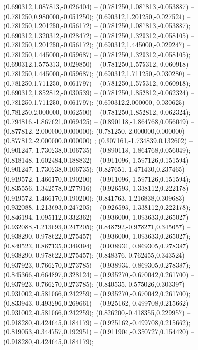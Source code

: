  (0.690312,1.087813,-0.026404) -- (0.781250,1.087813,-0.053887) -- (0.781250,0.980000,-0.051250);
 (0.690312,1.201250,-0.027524) -- (0.781250,1.201250,-0.056172) -- (0.781250,1.087813,-0.053887);
 (0.690312,1.320312,-0.028472) -- (0.781250,1.320312,-0.058105) -- (0.781250,1.201250,-0.056172);
 (0.690312,1.445000,-0.029247) -- (0.781250,1.445000,-0.059687) -- (0.781250,1.320312,-0.058105);
 (0.690312,1.575313,-0.029850) -- (0.781250,1.575312,-0.060918) -- (0.781250,1.445000,-0.059687);
 (0.690312,1.711250,-0.030280) -- (0.781250,1.711250,-0.061797) -- (0.781250,1.575312,-0.060918);
 (0.690312,1.852812,-0.030539) -- (0.781250,1.852812,-0.062324) -- (0.781250,1.711250,-0.061797);
 (0.690312,2.000000,-0.030625) -- (0.781250,2.000000,-0.062500) -- (0.781250,1.852812,-0.062324);
 (0.794816,-1.867621,0.069425) -- (0.890118,-1.864768,0.056049) -- (0.877812,-2.000000,0.000000);
 (0.781250,-2.000000,0.000000) -- (0.877812,-2.000000,0.000000) ;
 (0.807161,-1.734839,0.132602) -- (0.901247,-1.730238,0.106735) -- (0.890118,-1.864768,0.056049);
 (0.818148,-1.602484,0.188832) -- (0.911096,-1.597126,0.151594) -- (0.901247,-1.730238,0.106735);
 (0.827651,-1.471430,0.237465) -- (0.919572,-1.466170,0.190200) -- (0.911096,-1.597126,0.151594);
 (0.835556,-1.342578,0.277916) -- (0.926593,-1.338112,0.222178) -- (0.919572,-1.466170,0.190200);
 (0.841763,-1.216838,0.309683) -- (0.932088,-1.213693,0.247205) -- (0.926593,-1.338112,0.222178);
 (0.846194,-1.095112,0.332362) -- (0.936000,-1.093633,0.265027) -- (0.932088,-1.213693,0.247205);
 (0.848792,-0.978271,0.345657) -- (0.938290,-0.978622,0.275457) -- (0.936000,-1.093633,0.265027);
 (0.849523,-0.867135,0.349394) -- (0.938934,-0.869305,0.278387) -- (0.938290,-0.978622,0.275457);
 (0.848376,-0.762455,0.343524) -- (0.937923,-0.766270,0.273785) -- (0.938934,-0.869305,0.278387);
 (0.845366,-0.664897,0.328124) -- (0.935270,-0.670042,0.261700) -- (0.937923,-0.766270,0.273785);
 (0.840535,-0.575026,0.303397) -- (0.931002,-0.581066,0.242259) -- (0.935270,-0.670042,0.261700);
 (0.833943,-0.493296,0.269661) -- (0.925162,-0.499708,0.215662) -- (0.931002,-0.581066,0.242259);
 (0.826200,-0.418355,0.229957) -- (0.918280,-0.424645,0.184179) -- (0.925162,-0.499708,0.215662);
 (0.819053,-0.344757,0.192951) -- (0.911904,-0.350727,0.154420) -- (0.918280,-0.424645,0.184179);
